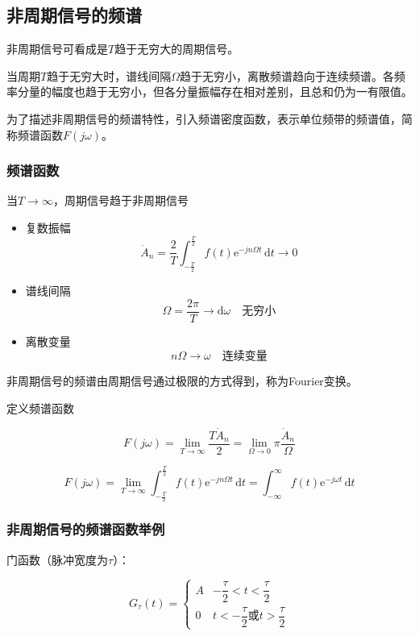 \documentclass[UTF8]{ctexart}
\begin{document}
\subsection{非周期信号的频谱}

非周期信号可看成是$T$趋于无穷大的周期信号。

当周期$T$趋于无穷大时，谱线间隔$\Omega$趋于无穷小，离散频谱趋向于连续频谱。各频率分量的幅度也趋于无穷小，但各分量振幅存在相对差别，且总和仍为一有限值。

为了描述非周期信号的频谱特性，引入频谱密度函数，表示单位频带的频谱值，简称频谱函数$F(jω)$。

\subsubsection{频谱函数}

当$T \rightarrow \infty$，周期信号趋于非周期信号

\begin{itemize}
    \item 复数振幅
    $$
    \dot{A}_n = \frac{2}{T} \int_{-\frac{T}{2}}^{\frac{T}{2}} f(t) \mathrm{e}^{-jn\Omega t} \,\mathrm{d}t \rightarrow 0
    $$
    \item 谱线间隔
    $$
    \Omega = \frac{2\pi}{T} \rightarrow \mathrm{d}\omega \quad \text{无穷小}
    $$
    \item 离散变量
    $$
    n\Omega \rightarrow \omega \quad \text{连续变量}
    $$
\end{itemize}

非周期信号的频谱由周期信号通过极限的方式得到，称为Fourier变换。

定义频谱函数

$$
F(j\omega) = \lim_{T\to\infty} \frac{T\dot{A}_n}{2} = \lim_{\Omega\to 0} \pi \frac{\dot{A}_n}{\Omega}
$$

$$
F(j\omega) = \lim_{T\to\infty} \int_{-\frac{T}{2}}^{\frac{T}{2}} f(t) \mathrm{e}^{-jn\Omega t} \,\mathrm{d}t = \int_{-\infty}^{\infty} f(t) \mathrm{e}^{-j\omega t} \,\mathrm{d}t
$$

\subsubsection{非周期信号的频谱函数举例}

门函数（脉冲宽度为$\tau$）：

$$
G_\tau(t) = \begin{cases} A & -\dfrac{\tau}{2} < t < \dfrac{\tau}{2} \\
0 & t < -\dfrac{\tau}{2} \text{或} t > \dfrac{\tau}{2} \end{cases}
$$
\end{document}

